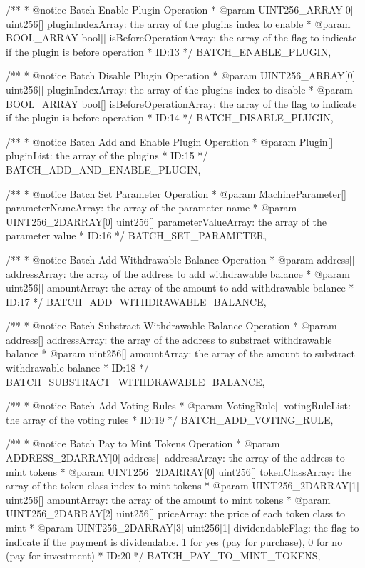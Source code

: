 \documentclass[main.tex]{subfiles}
\begin{document}
\begin{spverbatim}
  /**
   * @notice Batch Enable Plugin Operation
   * @param UINT256_ARRAY[0] uint256[] pluginIndexArray: the array of the plugins index to enable
   * @param BOOL_ARRAY bool[] isBeforeOperationArray: the array of the flag to indicate if the plugin is before operation
   * ID:13
   */
  BATCH_ENABLE_PLUGIN,

  /**
   * @notice Batch Disable Plugin Operation
   * @param UINT256_ARRAY[0] uint256[] pluginIndexArray: the array of the plugins index to disable
   * @param BOOL_ARRAY bool[] isBeforeOperationArray: the array of the flag to indicate if the plugin is before operation
   * ID:14
   */
  BATCH_DISABLE_PLUGIN,

  /**
   * @notice Batch Add and Enable Plugin Operation
   * @param Plugin[] pluginList: the array of the plugins
   * ID:15
   */
  BATCH_ADD_AND_ENABLE_PLUGIN,

  /**
   * @notice Batch Set Parameter Operation
   * @param MachineParameter[] parameterNameArray: the array of the parameter name
   * @param UINT256_2DARRAY[0] uint256[] parameterValueArray: the array of the parameter value
   * ID:16
   */
  BATCH_SET_PARAMETER,

  /**
   * @notice Batch Add Withdrawable Balance Operation
   * @param address[] addressArray: the array of the address to add withdrawable balance
   * @param uint256[] amountArray: the array of the amount to add withdrawable balance
   * ID:17
   */
  BATCH_ADD_WITHDRAWABLE_BALANCE,

  /**
   * @notice Batch Substract Withdrawable Balance Operation
   * @param address[] addressArray: the array of the address to substract withdrawable balance
   * @param uint256[] amountArray: the array of the amount to substract withdrawable balance
   * ID:18
   */
  BATCH_SUBSTRACT_WITHDRAWABLE_BALANCE,

  /**
   * @notice Batch Add Voting Rules
   * @param VotingRule[] votingRuleList: the array of the voting rules
   * ID:19
   */
  BATCH_ADD_VOTING_RULE,


  /**
   * @notice Batch Pay to Mint Tokens Operation
   * @param ADDRESS_2DARRAY[0] address[] addressArray: the array of the address to mint tokens
   * @param UINT256_2DARRAY[0] uint256[] tokenClassArray: the array of the token class index to mint tokens
   * @param UINT256_2DARRAY[1] uint256[] amountArray: the array of the amount to mint tokens
   * @param UINT256_2DARRAY[2] uint256[] priceArray: the price of each token class to mint
   * @param UINT256_2DARRAY[3] uint256[1] dividendableFlag: the flag to indicate if the payment is dividendable. 1 for yes (pay for purchase), 0 for no (pay for investment)
   * ID:20
   */
  BATCH_PAY_TO_MINT_TOKENS,


\end{spverbatim}
\end{document}
